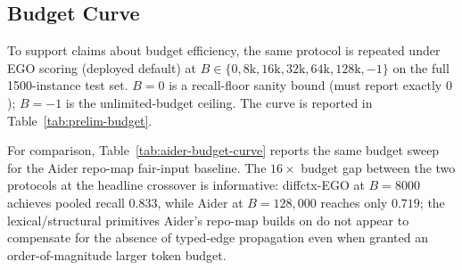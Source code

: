\documentclass[11pt, a4paper]{article}
\begin{document}
\subsection{Budget Curve}
\label{sec:prelim-budget}

To support claims about budget efficiency, the same protocol is repeated under EGO scoring (deployed default) at $B \in \{0, 8\mathrm{k}, 16\mathrm{k}, 32\mathrm{k}, 64\mathrm{k}, 128\mathrm{k}, -1\}$ on the full 1500-instance test set. $B{=}0$ is a recall-floor sanity bound (must report exactly $0$); $B{=}{-1}$ is the unlimited-budget ceiling. The curve is reported in Table~\ref{tab:prelim-budget}.

\begin{table}[h]
\centering
\small
\caption{Budget curve: pooled file recall under EGO mode (deployed default) across the budget grid, on the full 1500-instance test set. \emph{Mean used tokens} is the per-instance mean of selected-fragment token counts under \texttt{tiktoken o200k\_base}; the gap to the nominal budget reflects the lazy-greedy stopping rule rather than the budget being the binding constraint.}
\label{tab:prelim-budget}
\end{table}

For comparison, Table~\ref{tab:aider-budget-curve} reports the same budget sweep for the Aider repo-map fair-input baseline. The $16\times$ budget gap between the two protocols at the headline crossover is informative: diffctx-EGO at $B{=}8000$ achieves pooled recall $0.833$, while Aider at $B{=}128{,}000$ reaches only $0.719$; the lexical/structural primitives Aider's repo-map builds on do not appear to compensate for the absence of typed-edge propagation even when granted an order-of-magnitude larger token budget.
\end{document}
